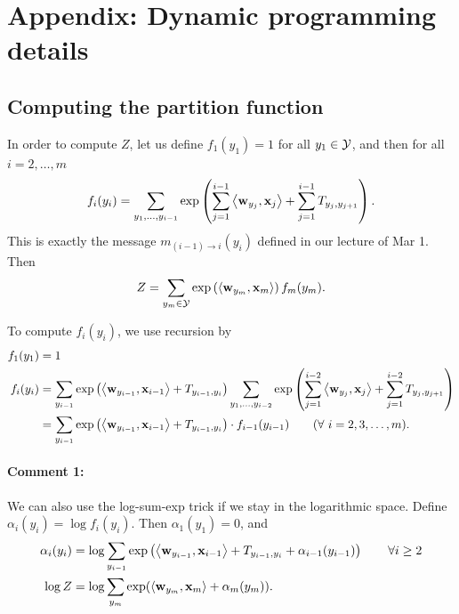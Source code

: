 \documentclass[11pt]{report}
\begin{document}
\section{Appendix: Dynamic programming details}

\subsection{Computing the partition function}

In order to compute $Z$, let us define $f_1(y_1) = 1$ for all $y_1 \in \mathcal{Y}$, and then for all $i = 2, \ldots, m$
\begin{align}
	f_i(y_i) = \sum_{y_1, \ldots, y_{i-1}} \exp \left(\sum_{j=1}^{i-1} \left\langle \mathbf{\boldsymbol{w}}_{y_j},\mathbf{\boldsymbol{x}}_j \right\rangle + \sum_{j=1}^{i-1} T_{y_j, y_{j+1}}\right).
\end{align}
This is exactly the message $m_{(i-1) \to i}(y_{i})$ defined in our lecture of Mar 1.
Then
\begin{align}
	Z = \sum_{y_m \in \mathcal{Y}} \exp \left(\left\langle \mathbf{\boldsymbol{w}}_{y_m},\mathbf{\boldsymbol{x}}_m \right\rangle\right) f_m(y_m) .
\end{align}

To compute $f_i(y_i)$, we use recursion by
\begin{align}
	\label{eq:rec_Z_forward_1}
	f_1(y_1) &= 1 \\
	f_i(y_i) &= \sum_{y_{i-1}} \exp \left(\left\langle \mathbf{\boldsymbol{w}}_{y_{i-1}},\mathbf{\boldsymbol{x}}_{i-1} \right\rangle + T_{y_{i-1}, y_i}\right)
	\sum_{y_1, \ldots, y_{i-2}} \exp \left(\sum_{j=1}^{i-2} \left\langle \mathbf{\boldsymbol{w}}_{y_j},\mathbf{\boldsymbol{x}}_j \right\rangle + \sum_{j=1}^{i-2} T_{y_j, y_{j+1}}\right) \\
	\label{eq:rec_Z_forward_2}
	&= \sum_{y_{i-1}} \exp \left(\left\langle \mathbf{\boldsymbol{w}}_{y_{i-1}},\mathbf{\boldsymbol{x}}_{i-1} \right\rangle + T_{y_{i-1}, y_i}\right)  \cdot f_{i-1}(y_{i-1})  \qquad (\forall\ i = 2, 3, \ldots, m).	 
\end{align}

\paragraph{Comment 1:}
We can also use the log-sum-exp trick if we stay in the logarithmic space. 
Define $\alpha_i(y_i) = \log f_i(y_i)$.
Then $\alpha_1(y_1) = 0$, and
\begin{align}
	\alpha_i(y_i) &= \log \sum_{y_{i-1}} \exp \left(\left\langle \mathbf{\boldsymbol{w}}_{y_{i-1}},\mathbf{\boldsymbol{x}}_{i-1} \right\rangle + T_{y_{i-1}, y_i} + \alpha_{i-1}(y_{i-1})\right) \qquad \forall i \ge 2\\
	\log Z &= \log \sum_{y_m} \exp (\left\langle \mathbf{\boldsymbol{w}}_{y_m},\mathbf{\boldsymbol{x}}_m \right\rangle + \alpha_m(y_m)).
\end{align}
\end{document}
